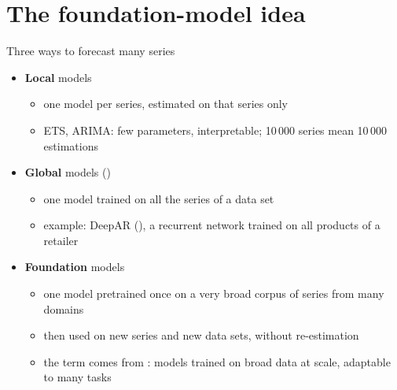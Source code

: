 \section{The foundation-model idea}

\begin{frame}{Three ways to forecast many series}
\itemsize{\small}
\begin{itemize}
    \item \textbf{Local} models
    \begin{itemize}
        \item one model per series, estimated on that series only
        \item ETS, ARIMA: few parameters, interpretable; 10\,000 series mean 10\,000 estimations
    \end{itemize}
    \item \textbf{Global} models ()
    \begin{itemize}
        \item one model trained on all the series of a data set
        \item example: DeepAR (), a recurrent network trained on all products of a retailer
    \end{itemize}
    \item \textbf{Foundation} models
    \begin{itemize}
        \item one model pretrained once on a very broad corpus of series from many domains
        \item then used on new series and new data sets, without re-estimation
        \item the term comes from : models trained on broad data at scale, adaptable to many tasks
    \end{itemize}
\end{itemize}
\end{frame}

